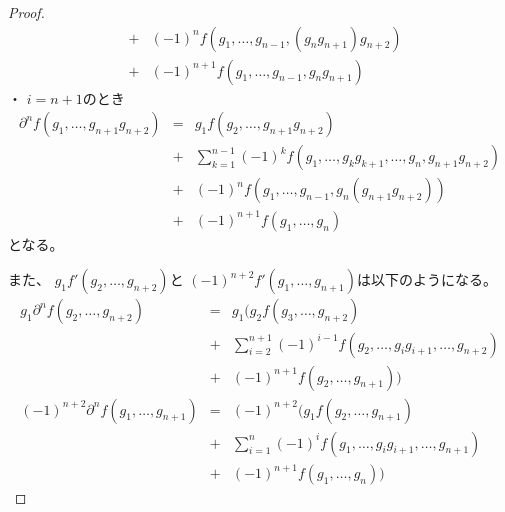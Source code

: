 \documentclass[../master_galois_theory]{subfiles}
\begin{document}
\begin{proof}
\begin{eqnarray*}
    & + & (-1)^n f(g_1 , \dots , g_{n-1} , (g_n g_{n+1}) g_{n+2}) \\
    & + & (-1)^{n+1} f(g_1 , \dots , g_{n-1} , g_n g_{n+1})
  \end{eqnarray*}
  ・ $i = n+1$のとき
  \begin{eqnarray*}
    \partial^n f(g_1 , \dots , g_{n+1} g_{n+2}) & = & g_1 f(g_2 , \dots , g_{n+1} g_{n+2}) \\
    & + & \sum_{k=1}^{n-1} (-1)^k f(g_1 , \dots , g_k g_{k+1} , \dots , g_n , g_{n+1} g_{n+2}) \\
    & + & (-1)^n f(g_1 , \dots , g_{n-1} , g_n (g_{n+1} g_{n+2})) \\
    & + & (-1)^{n+1} f(g_1 , \dots , g_n)
  \end{eqnarray*}
となる。

また、 $g_1 f'(g_2 , \dots , g_{n+2})$と $(-1)^{n+2} f'(g_1 , \dots , g_{n+1})$は以下のようになる。
\begin{eqnarray*}
  g_1 \partial^n f(g_2 , \dots , g_{n+2}) & = & g_1 (g_2 f(g_3 , \dots , g_{n+2}) \\
  & + & \sum_{i=2}^{n+1} (-1)^{i-1} f(g_2 , \dots , g_i g_{i+1} , \dots , g_{n+2}) \\
  & + & (-1)^{n+1} f(g_2 , \dots , g_{n+1}) ) \\
  (-1)^{n+2} \partial^n f(g_1 , \dots , g_{n+1}) & = & (-1)^{n+2} (g_1 f(g_2 , \dots , g_{n+1}) \\
  & + & \sum_{i=1}^n (-1)^i f(g_1 , \dots , g_i g_{i+1} , \dots , g_{n+1}) \\
  & + & (-1)^{n+1} f(g_1 , \dots , g_n) )
\end{eqnarray*}


\end{proof}
\end{document}
